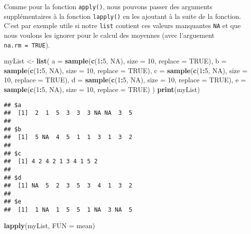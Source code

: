 \documentclass[]{book}
\newenvironment{Shaded}{\begin{snugshade}}{\end{snugshade}}
\newcommand{\KeywordTok}[1]{\textcolor[rgb]{0.13,0.29,0.53}{\textbf{#1}}}
\newcommand{\DataTypeTok}[1]{\textcolor[rgb]{0.13,0.29,0.53}{#1}}
\newcommand{\DecValTok}[1]{\textcolor[rgb]{0.00,0.00,0.81}{#1}}
\newcommand{\StringTok}[1]{\textcolor[rgb]{0.31,0.60,0.02}{#1}}
\newcommand{\OtherTok}[1]{\textcolor[rgb]{0.56,0.35,0.01}{#1}}
\newcommand{\OperatorTok}[1]{\textcolor[rgb]{0.81,0.36,0.00}{\textbf{#1}}}
\newcommand{\NormalTok}[1]{#1}
\theoremstyle{definition}
\theoremstyle{definition}
\theoremstyle{definition}
\theoremstyle{remark}
\begin{document}
Comme pour la fonction \texttt{apply()}, nous pouvons passer des
arguments supplémentaires à la fonction \texttt{lapply()} en les
ajoutant à la suite de la fonction. C'est par exemple utile si notre
\texttt{list} contient ces valeurs manquantes \texttt{NA} et que nous
voulons les ignorer pour le calcul des moyennes (avec l'arguement
\texttt{na.rm\ =\ TRUE}).

\begin{Shaded}
\begin{Highlighting}[]
\NormalTok{myList <-}\StringTok{ }\KeywordTok{list}\NormalTok{(}
  \DataTypeTok{a =} \KeywordTok{sample}\NormalTok{(}\KeywordTok{c}\NormalTok{(}\DecValTok{1}\OperatorTok{:}\DecValTok{5}\NormalTok{, }\OtherTok{NA}\NormalTok{), }\DataTypeTok{size =} \DecValTok{10}\NormalTok{, }\DataTypeTok{replace =} \OtherTok{TRUE}\NormalTok{), }
  \DataTypeTok{b =} \KeywordTok{sample}\NormalTok{(}\KeywordTok{c}\NormalTok{(}\DecValTok{1}\OperatorTok{:}\DecValTok{5}\NormalTok{, }\OtherTok{NA}\NormalTok{), }\DataTypeTok{size =} \DecValTok{10}\NormalTok{, }\DataTypeTok{replace =} \OtherTok{TRUE}\NormalTok{), }
  \DataTypeTok{c =} \KeywordTok{sample}\NormalTok{(}\KeywordTok{c}\NormalTok{(}\DecValTok{1}\OperatorTok{:}\DecValTok{5}\NormalTok{, }\OtherTok{NA}\NormalTok{), }\DataTypeTok{size =} \DecValTok{10}\NormalTok{, }\DataTypeTok{replace =} \OtherTok{TRUE}\NormalTok{), }
  \DataTypeTok{d =} \KeywordTok{sample}\NormalTok{(}\KeywordTok{c}\NormalTok{(}\DecValTok{1}\OperatorTok{:}\DecValTok{5}\NormalTok{, }\OtherTok{NA}\NormalTok{), }\DataTypeTok{size =} \DecValTok{10}\NormalTok{, }\DataTypeTok{replace =} \OtherTok{TRUE}\NormalTok{), }
  \DataTypeTok{e =} \KeywordTok{sample}\NormalTok{(}\KeywordTok{c}\NormalTok{(}\DecValTok{1}\OperatorTok{:}\DecValTok{5}\NormalTok{, }\OtherTok{NA}\NormalTok{), }\DataTypeTok{size =} \DecValTok{10}\NormalTok{, }\DataTypeTok{replace =} \OtherTok{TRUE}\NormalTok{)}
\NormalTok{)}
\KeywordTok{print}\NormalTok{(myList)}
\end{Highlighting}
\end{Shaded}

\begin{verbatim}
## $a
##  [1]  2  1  5  3  3  3 NA NA  3  5
## 
## $b
##  [1]  5 NA  4  5  1  1  3  1  3  2
## 
## $c
##  [1] 4 2 4 2 1 3 4 1 5 2
## 
## $d
##  [1] NA  5  2  3  5  3  4  1  3  2
## 
## $e
##  [1]  1 NA  1  5  5  1 NA  3 NA  5
\end{verbatim}

\begin{Shaded}
\begin{Highlighting}[]
\KeywordTok{lapply}\NormalTok{(myList, }\DataTypeTok{FUN =}\NormalTok{ mean)}
\end{Highlighting}
\end{Shaded}
\end{document}
